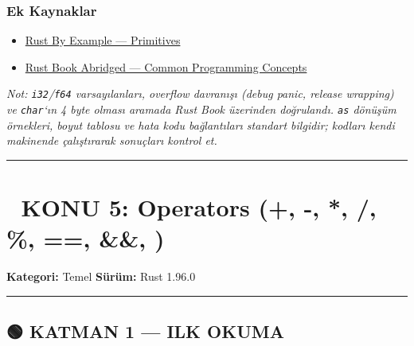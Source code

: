 \documentclass[12pt,a4paper]{article}
\begin{document}
\subsubsection{Ek Kaynaklar}\label{ek-kaynaklar-3}

\begin{itemize}
\tightlist
\item
  \href{https://doc.rust-lang.org/rust-by-example/primitives.html}{Rust By Example --- Primitives}
\item
  \href{https://jasonwalton.ca/rust-book-abridged/ch03-common-programming-concepts}{Rust Book Abridged --- Common Programming Concepts}
\end{itemize}

\emph{Not: \texttt{i32}/\texttt{f64} varsayılanları, overflow davranışı (debug panic, release wrapping) ve \texttt{char}`ın 4 byte olması aramada Rust Book üzerinden doğrulandı. \texttt{as} dönüşüm örnekleri, boyut tablosu ve hata kodu bağlantıları standart bilgidir; kodları kendi makinende çalıştırarak sonuçları kontrol et.}

\begin{center}\rule{0.5\linewidth}{0.5pt}\end{center}

\section{📘 KONU 5: Operators (+, -, *, /, \%, ==, \&\&, \textbar\textbar)}\label{konu-5-operators}

\textbf{Kategori:} Temel \textbar{} \textbf{Sürüm:} Rust 1.96.0

\begin{center}\rule{0.5\linewidth}{0.5pt}\end{center}

\subsection{🟢 KATMAN 1 --- ILK OKUMA}\label{katman-1-—-ilk-okuma-4}
\end{document}
